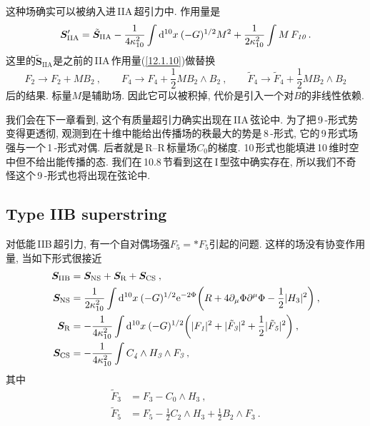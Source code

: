 这种场确实可以被纳入进\,IIA\,超引力中. 作用量是
\begin{equation}
    \bm{S}_{\text{IIA}}^{\prime}=\tilde{\bm{S}}_{\text{IIA}}-\frac{1}{4\kappa_{10}^{2}}\int\mathrm{d}^{10}x\: (-G)^{1/2}M^{2}+\frac{1}{2\kappa_{10}^{2}}\int M\,F_{\textit{10}}\:. \label{12.1.24}
\end{equation}
这里的$\tilde{\bm{S}}_{\text{IIA}}$是之前的\,IIA\,作用量(\ref{12.1.10})做替换
\begin{equation}
    F_{\textit{2}}\to F_{\textit{2}}+MB_{\textit{2}}\:, \qquad 
    F_{\textit{4}}\to F_{\textit{4}}+\frac{1}{2}MB_{\textit{2}}\wedge B_{\textit{2}}\:,\qquad \tilde{F}_{\textit{4}}\to\tilde{F}_{\textit{4}}+\frac{1}{2}MB_{\textit{2}}\wedge B_\textit{2} \label{12.1.25}
\end{equation}
后的结果. 标量$ M $是辅助场. 因此它可以被积掉, 代价是引入一个对$ B $的非线性依赖.

我们会在下一章看到, 这个有质量超引力确实出现在\,IIA\,弦论中. 为了把\,9\,-形式势变得更透彻, 观测到在十维中能给出传播场的秩最大的势是\,8\,-形式, 它的\,9\,形式场强与一个\,1\,-形式对偶. 后者就是\,R--R\,标量场$ C_{\textit{0}} $的梯度. 10\,形式也能填进\,10\,维时空中但不给出能传播的态. 我们在\,10.8\,节看到这在\,I\,型弦中确实存在, 所以我们不奇怪这个\,9\,-形式也将出现在弦论中.


\subsection*{Type IIB superstring}
 
对低能\,IIB\,超引力, 有一个自对偶场强$ F_{\textit{5}}=\ast F_{\textit{5}} $引起的问题. 这样的场没有协变作用量, 当如下形式很接近
\begin{subequations}
\begin{align}
    \bm{S}_{\text{IIB}}&=\bm{S}_{\text{NS}}+\bm{S}_{\text{R}}+\bm{S}_{\text{CS}} \:, \label{12.1.26a} \\
    \bm{S}_{\text{NS}}&=\frac{1}{2\kappa_{10}^{2}}\int\mathrm{d}^{10}x\:(-G)^{1/2}\mathrm{e}^{-2\Phi}
    \biggl(R+4\partial_{\mu}\Phi\partial^{\mu}\Phi-\frac{1}{2}\lvert H_{3}\rvert^{2}\biggr) \:,\label{12.1.26b} \\
    \bm{S}_{\text{R}}&=- \frac{1}{4\kappa_{10}^{2}} \int \mathrm{d}^{10}x\:(-G)^{1/2}\biggl(\lvert F_{\textit{1}}\rvert^{2}+\lvert\tilde{F}_{\textit{3}}\rvert^{2}+\frac{1}{2}\lvert\tilde{F}_{\textit{5}}\rvert^{2}\biggr) \:, \label{12.1.26c} \\
    \bm{S}_{\text{CS}}&=-\frac{1}{4\kappa_{10}^{2}}\int C_{\textit{4}}\wedge H_{\textit{3}}\wedge F_{\textit{3}} \:,
\end{align}
\end{subequations}
其中
\begin{subequations}
\begin{align}
    \tilde{F}_{\textit{3}} &= F_{\textit{3}}- C_{\textit{0}}\wedge H_{\textit{3}} \:, \label{12.1.27a}\\
    \tilde{F}_{\textit{5}} &= F_{\textit{5}} -\frac{1}{2}C_{\textit{2}}\wedge H_{\textit{3}} +\frac{1}{2}B_{\textit{2}}\wedge F_{\textit{3}} \:. \label{12.1.27b}
\end{align}
\end{subequations}



